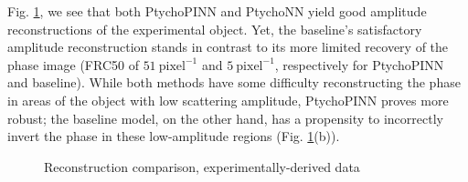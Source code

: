 \documentclass[sn-mathphys]{sn-jnl}%
\theoremstyle{thmstyleone}%
\theoremstyle{thmstyletwo}%
\theoremstyle{thmstylethree}%
\begin{document}
Fig. \ref{fig:exp_comparison_detailed}, we see that both PtychoPINN and PtychoNN yield good amplitude reconstructions of the experimental object. Yet, the baseline's satisfactory amplitude reconstruction stands in contrast to its more limited recovery of the phase image (FRC50 of $51~\mathrm{pixel}^{-1}$ and $5~\mathrm{pixel}^{-1}$, respectively for PtychoPINN and baseline). While both methods have some difficulty reconstructing the phase in areas of the object with low scattering amplitude, PtychoPINN proves more robust; the baseline model, on the other hand, has a propensity to incorrectly invert the phase in these low-amplitude regions (Fig. \ref{fig:exp_comparison_detailed}(b)).



\begin{figure}%
    \centering
\vfill
    \caption{Reconstruction comparison, experimentally-derived data}%
    \label{fig:exp_comparison_detailed}%
\end{figure}
\end{document}
